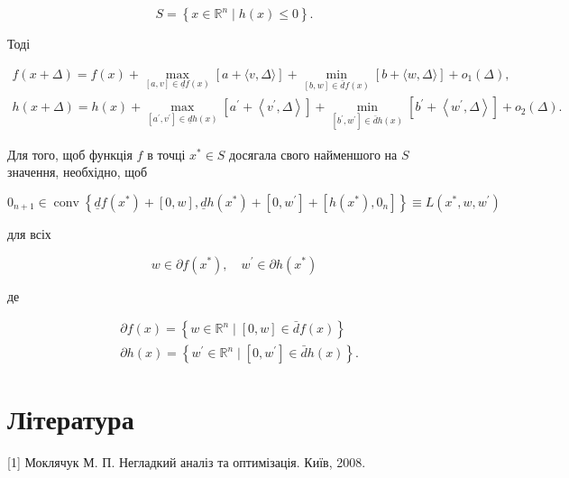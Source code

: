 \documentclass[10pt]{article}
\begin{document}
$$
S=\left\{x \in \mathbb{R}^{n} \mid h(x) \leq 0\right\} .
$$

Тоді

$$
\begin{gathered}
f(x+\Delta)=f(x)+\max _{[a, v] \in \underline{d} f(x)}[a+\langle v, \Delta\rangle]+\min _{[b, w] \in \bar{d} f(x)}[b+\langle w, \Delta\rangle]+o_{1}(\Delta), \\
h(x+\Delta)=h(x)+\max _{\left[a^{\prime}, v^{\prime}\right] \in \underline{d} h(x)}\left[a^{\prime}+\left\langle v^{\prime}, \Delta\right\rangle\right]+\min _{\left[b^{\prime}, w^{\prime}\right] \in \bar{d} h(x)}\left[b^{\prime}+\left\langle w^{\prime}, \Delta\right\rangle\right]+o_{2}(\Delta) .
\end{gathered}
$$

Для того, щоб функція $f$ в точці $x^{*} \in S$ досягала свого найменшого на $S$ значення, необхідно, щоб

$$
0_{n+1} \in \operatorname{conv}\left\{\underline{d} f\left(x^{*}\right)+[0, w], \underline{d} h\left(x^{*}\right)+\left[0, w^{\prime}\right]+\left[h\left(x^{*}\right), 0_{n}\right]\right\} \equiv L\left(x^{*}, w, w^{\prime}\right)
$$

для всіх

$$
w \in \partial f\left(x^{*}\right), \quad w^{\prime} \in \partial h\left(x^{*}\right)
$$

де

$$
\begin{aligned}
& \partial f(x)=\left\{w \in \mathbb{R}^{n} \mid[0, w] \in \bar{d} f(x)\right\} \\
& \partial h(x)=\left\{w^{\prime} \in \mathbb{R}^{n} \mid\left[0, w^{\prime}\right] \in \bar{d} h(x)\right\} .
\end{aligned}
$$

\section*{Література}
[1] Моклячук М. П. Негладкий аналіз та оптимізація. Київ, 2008.
\end{document}
